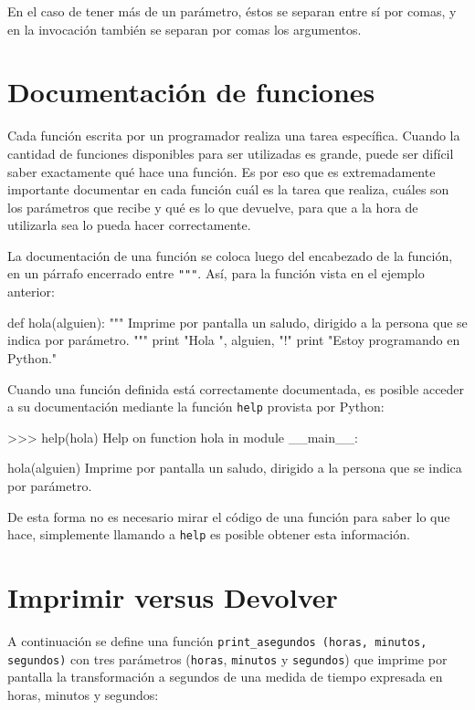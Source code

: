 En el caso de tener más de un parámetro, éstos se separan entre sí por comas,
y en la invocación también se separan por comas los argumentos.

\section{Documentación de funciones}

Cada función escrita por un programador realiza una tarea específica.  Cuando
la cantidad de funciones disponibles para ser utilizadas es grande, puede ser
difícil saber exactamente qué hace una función.  Es por eso que es
extremadamente importante documentar en cada función cuál es la tarea que
realiza, cuáles son los parámetros que recibe y qué es lo que devuelve, para
que a la hora de utilizarla sea lo pueda hacer correctamente.

La documentación de una función se coloca luego del encabezado de la función,
en un párrafo encerrado entre \lstinline!"""!.  Así, para la función vista en
el ejemplo anterior:

\begin{codigo-python-sn}
def hola(alguien):
    """ Imprime por pantalla un saludo, dirigido a la persona que 
        se indica por parámetro. """
    print "Hola ", alguien, "!"
    print "Estoy programando en Python."
\end{codigo-python-sn}

Cuando una función definida está correctamente documentada, es posible acceder
a su documentación mediante la función \lstinline!help! provista por Python:

\begin{codigo-python-sn}
>>> help(hola)
Help on function hola in module __main__:

hola(alguien)
    Imprime por pantalla un saludo, dirigido a la persona que
    se indica por parámetro.
\end{codigo-python-sn}

De esta forma no es necesario mirar el código de una función para saber lo que
hace, simplemente llamando a \lstinline!help! es posible obtener esta
información.

\section{Imprimir versus Devolver}

A continuación se define una función 
\lstinline+print_asegundos (horas, minutos, segundos)+ 
con tres parámetros (\lstinline+horas+, \lstinline+minutos+
y \lstinline+segundos+) que imprime por pantalla la transformación a segundos
de una medida de tiempo expresada en horas, minutos y segundos:

